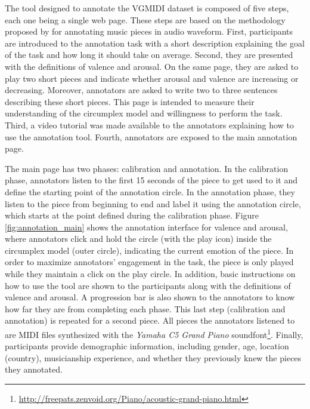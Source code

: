The tool designed to annotate the VGMIDI dataset is composed of five steps, each one being a single web page. These steps are based on the methodology proposed by \citet{Soleymani_2013} for annotating music pieces in audio waveform. First, participants are introduced to the annotation task with a short description explaining the goal of the task and how long it should take on average. Second, they are presented with the definitions of valence and arousal. On the same page, they are asked to play two short pieces and indicate whether arousal and valence are increasing or decreasing. Moreover, annotators are asked to write two to three sentences describing these short pieces. This page is intended to measure their understanding of the circumplex model and willingness to perform the task. Third, a video tutorial was made available to the annotators explaining how to use the annotation tool. Fourth, annotators are exposed to the main annotation page.

The main page has two phases: calibration and annotation. In the calibration phase, annotators listen to the first 15 seconds of the piece to get used to it and define the starting point of the annotation circle. In the annotation phase, they listen to the piece from beginning to end and label it using the annotation circle, which starts at the point defined during the calibration phase. Figure \ref{fig:annotation_main} shows the annotation interface for valence and arousal, where annotators click and hold the circle (with the play icon) inside the circumplex model (outer circle), indicating the current emotion of the piece. In order to maximize annotators' engagement in the task, the piece is only played while they maintain a click on the play circle. In addition, basic instructions on how to use the tool are shown to the participants along with the definitions of valence and arousal. A progression bar is also shown to the annotators to know how far they are from completing each phase. This last step (calibration and annotation) is repeated for a second piece. All pieces the annotators listened to are MIDI files synthesized with the \textit{Yamaha C5 Grand Piano} soundfont\footnote{\url{http://freepats.zenvoid.org/Piano/acoustic-grand-piano.html}}. Finally, participants provide demographic information, including gender, age, location (country), musicianship experience, and whether they previously knew the pieces they annotated.

